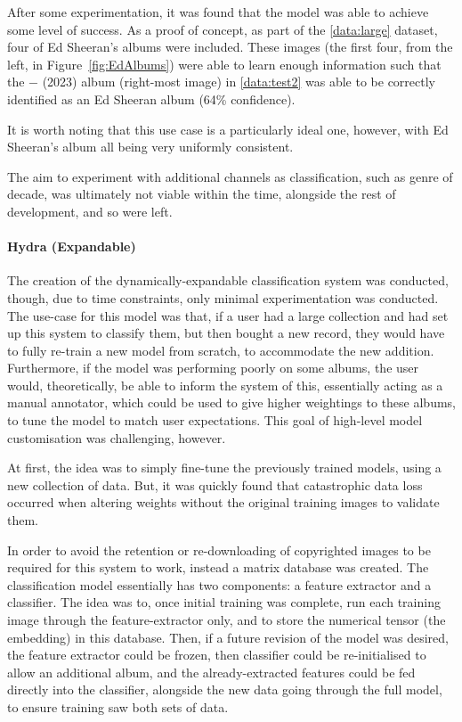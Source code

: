                 After some experimentation, it was found that the model was able to achieve some level of success. As a proof of concept, as part of the \ref{data:large} dataset, four of Ed Sheeran's albums were included. These images (the first four, from the left, in Figure~\ref{fig:EdAlbums}) were able to learn enough information such that the − (2023) album (right-most image) in \ref{data:test2} was able to be correctly identified as an Ed Sheeran album (64\% confidence).
    
                It is worth noting that this use case is a particularly ideal one, however, with Ed Sheeran's album all being very uniformly consistent.
    
                The aim to experiment with additional channels as classification, such as genre of decade, was ultimately not viable within the time, alongside the rest of development, and so were left.
    
                \paragraph{Hydra (Expandable)}
    
                The creation of the dynamically-expandable classification system was conducted, though, due to time constraints, only minimal experimentation was conducted. The use-case for this model was that, if a user had a large collection and had set up this system to classify them, but then bought a new record, they would have to fully re-train a new model from scratch, to accommodate the new addition. Furthermore, if the model was performing poorly on some albums, the user would, theoretically, be able to inform the system of this, essentially acting as a manual annotator, which could be used to give higher weightings to these albums, to tune the model to match user expectations. This goal of high-level model customisation was challenging, however.
    
                At first, the idea was to simply fine-tune the previously trained models, using a new collection of data. But, it was quickly found that catastrophic data loss occurred when altering weights without the original training images to validate them.
    
                In order to avoid the retention or re-downloading of copyrighted images to be required for this system to work, instead a matrix database was created. The classification model essentially has two components: a feature extractor and a classifier. The idea was to, once initial training was complete, run each training image through the feature-extractor only, and to store the numerical tensor (the embedding) in this database. Then, if a future revision of the model was desired, the feature extractor could be frozen, then classifier could be re-initialised to allow an additional album, and the already-extracted features could be fed directly into the classifier, alongside the new data going through the full model, to ensure training saw both sets of data.
    
